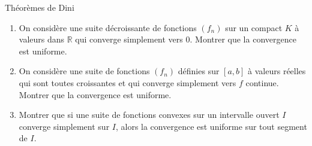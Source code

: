 \documentclass[french]{book}
\newcommand{\R}{\mathbb{R}}
\theoremstyle{definition}
\theoremstyle{remark}
\begin{document}
\begin{exo}[3]{Théorèmes de Dini}
	\begin{enumerate}
		\item On considère une suite décroissante de fonctions $(f_n)$ sur un compact $K$ à valeurs dans $\R$ qui converge simplement vers $0$. Montrer que la convergence est uniforme.
		\item On considère une suite de fonctions $(f_n)$ définies sur $[a,b]$ à valeurs réelles qui sont toutes croissantes et qui converge simplement vers $f$ continue. Montrer que la convergence est uniforme.
		\item Montrer que si une suite de fonctions convexes sur un intervalle ouvert $I$ converge simplement sur $I$, alors la convergence est uniforme sur tout segment de $I$.
	\end{enumerate}
\end{exo}
\end{document}
